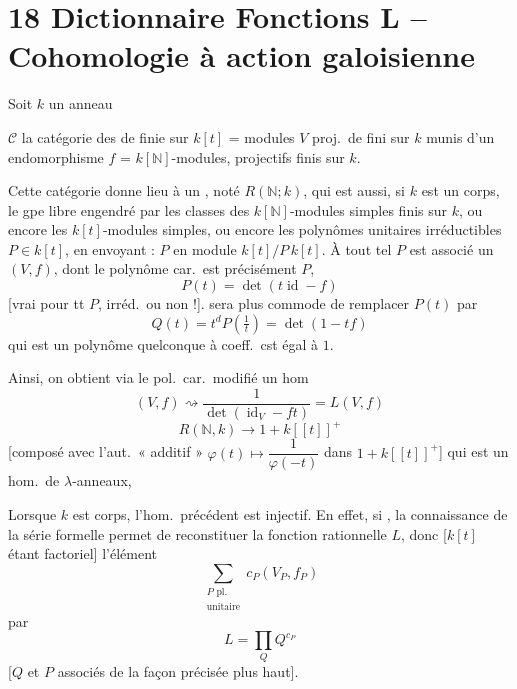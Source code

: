 \documentclass[11pt,a4paper]{article}
\begin{document}
\section{18 Dictionnaire Fonctions L -- Cohomologie à action galoisienne}

Soit $k$ un  anneau

 $\mathcal{C}$ la catégorie des  de
 
finie sur $k[t]$ = modules $V$ proj.\ de 
  fini sur $k$ munis d'un endomorphisme $f$ =
$k[\mathbb{N}]$-modules, projectifs  finis sur $k$.

Cette catégorie donne lieu à un , noté
$R(\mathbb{N}; k)$, qui est aussi, si $k$ est un corps, le
\struck{\ill{}} gpe libre engendré par les classes des
$k[\mathbb{N}]$-modules simples finis sur $k$, ou encore les
$k[t]$-modules simples, ou encore les polynômes unitaires
irréductibles $P \in k[t]$, en envoyant : $P$ en module $k[t]/P\,k[t]$. À tout tel
$P$ est associé un
$(V, f)$, dont le polynôme car.\ est précisément $P$,
\[
  P(t) = \det(t \operatorname{id} - f)
\]
[vrai pour tt $P$, irréd.\ ou non !].  sera plus commode
de remplacer $P(t)$ par
\[
  Q(t) = t^{d} P(\tfrac{1}{t}) = \det(1 - tf)
\]
qui est un polynôme quelconque à coeff.\ cst égal à $1$.

Ainsi, on obtient via le pol.\ car.\ modifié un hom
\[
  (V, f) \rightsquigarrow \frac{1}{\det(\operatorname{id}_{V} - f t)} = L(V, f)
\]
\[
  R(\mathbb{N}, k) \longrightarrow 1 + k[[t]]^{+}
\]
[composé avec l'aut.\ « additif »
$\varphi(t) \mapsto \dfrac{1}{\varphi(-t)}$ dans $1 + k[[t]]^{+}$] qui est un
hom.\ de $\lambda$-anneaux,

Lorsque $k$ est  corps, l'hom.\ précédent est injectif. En effet,
si \struck{\ill{}}, la connaissance de la série formelle permet de
reconstituer la fonction rationnelle $L$, donc
[$k[t]$ étant factoriel] l'élément
\[
  \sum_{\substack{P \text{ pl.} \\ \text{unitaire}}} c_{P} (V_{P}, f_{P})
\]
 par
\[
  L = \prod_{Q} Q^{c_{P}}
\]
[$Q$ et $P$ associés de la façon précisée plus haut].
\end{document}
